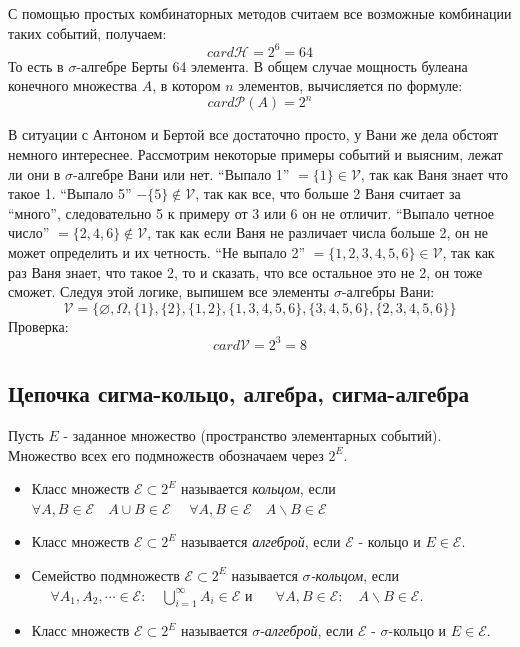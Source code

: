 \begin{exmp}
	С помощью простых комбинаторных методов считаем все возможные комбинации таких событий, получаем:
	\[ card\mathcal{H}=2^6=64 \]
	То есть в $\sigma$-алгебре Берты 64 элемента. В общем случае мощность булеана конечного множества $A$, в котором $n$ элементов, вычисляется по формуле:
	\[ card \mathcal{P} (A) = 2^n \]
	
	В ситуации с Антоном и Бертой все достаточно просто, у Вани же дела обстоят немного интереснее. Рассмотрим некоторые примеры событий и выясним, лежат ли они в $\sigma$-алгебре Вани или нет. “Выпало 1” $= \{ 1 \} \in \mathcal{V}$, так как Ваня знает что такое 1. “Выпало 5” $- \{ 5 \} \notin \mathcal{V}$, так как все, что больше 2 Ваня считает за “много”, следовательно 5 к примеру от 3 или 6 он не отличит. “Выпало четное число” $=\{ 2, 4, 6 \} \notin \mathcal{V}$, так как если Ваня не различает числа больше 2, он не может определить и их четность. “Не выпало 2” $=\{ 1, 2, 3, 4, 5, 6 \} \in \mathcal{V}$, так как раз Ваня знает, что такое 2, то и сказать, что все остальное это не 2, он тоже сможет. Следуя этой логике, выпишем все элементы $\sigma$-алгебры Вани:
	\[ \mathcal{V}=\{\varnothing,\Omega,\{1\},\{2\},\{1,2\},\{1,3,4,5,6\},\{3,4,5,6\},\{2,3,4,5,6\}\} \]
	Проверка:
	\[ card \mathcal{V} = 2^3 = 8 \]
\end{exmp}

\subsection{Цепочка сигма-кольцо, алгебра, сигма-алгебра}

Пусть $E$ - заданное множество (пространство элементарных событий). Множество всех его подмножеств обозначаем через $2^E$.
\begin{itemize}
	\item Класс множеств $\mathscr{E}\subset 2^E$ называется \textit{кольцом}, если $\forall A,B\in\mathscr{E}\quad A\cup B\in\mathscr{E}
	\quad\,\,\forall A,B\in\mathscr{E}\quad A\backslash B\in\mathscr{E}$
	\item Класс множеств $\mathscr{E}\subset 2^E$ называется \textit{алгеброй}, если $\mathscr{E}$ - кольцо и $E\in\mathscr{E}$.
	\item Семейство подмножеств $\mathscr{E}\subset 2^E$ называется $\sigma$\textit{-кольцом}, если
	$\quad\,\,\forall A_1,A_2,\cdots\in\mathscr{E}:\quad \bigcup\limits_{i=1}^{\infty}A_i\in\mathscr{E}$ и
	$\quad\,\,\forall A,B\in\mathscr{E}:\quad A\backslash B\in\mathscr{E}$.
	\item Класс множеств $\mathscr{E}\subset 2^E$ называется $\sigma$-\textit{алгеброй}, если $\mathscr{E}$ - $\sigma$-кольцо и $E\in\mathscr{E}$.
\end{itemize}

